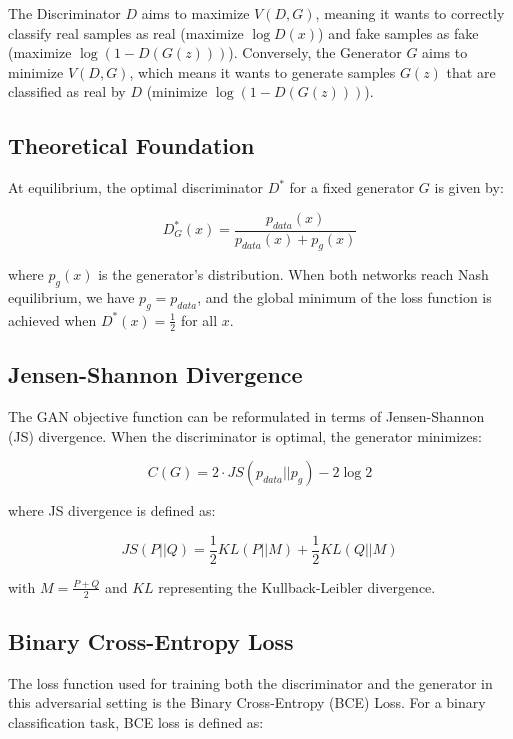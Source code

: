 \documentclass[a4paper, journal]{IEEEtran}
\begin{document}
The Discriminator $D$ aims to maximize $V(D, G)$, meaning it wants to correctly classify real samples as real (maximize $\log D(x)$) and fake samples as fake (maximize $\log(1 - D(G(z)))$). Conversely, the Generator $G$ aims to minimize $V(D, G)$, which means it wants to generate samples $G(z)$ that are classified as real by $D$ (minimize $\log(1 - D(G(z)))$).

\subsection{Theoretical Foundation}
At equilibrium, the optimal discriminator $D^*$ for a fixed generator $G$ is given by:

\begin{equation}
    D^*_G(x) = \frac{p_{data}(x)}{p_{data}(x) + p_g(x)}
    \label{eq:optimal_discriminator}
\end{equation}

where $p_g(x)$ is the generator's distribution. When both networks reach Nash equilibrium, we have $p_g = p_{data}$, and the global minimum of the loss function is achieved when $D^*(x) = \frac{1}{2}$ for all $x$.

\subsection{Jensen-Shannon Divergence}
The GAN objective function can be reformulated in terms of Jensen-Shannon (JS) divergence. When the discriminator is optimal, the generator minimizes:

\begin{equation}
    C(G) = 2 \cdot JS(p_{data} || p_g) - 2\log 2
    \label{eq:js_divergence}
\end{equation}

where JS divergence is defined as:

\begin{equation}
    JS(P||Q) = \frac{1}{2}KL(P||M) + \frac{1}{2}KL(Q||M)
    \label{eq:js_definition}
\end{equation}

with $M = \frac{P + Q}{2}$ and $KL$ representing the Kullback-Leibler divergence.

\subsection{Binary Cross-Entropy Loss}
The loss function used for training both the discriminator and the generator in this adversarial setting is the Binary Cross-Entropy (BCE) Loss. For a binary classification task, BCE loss is defined as:
\end{document}
